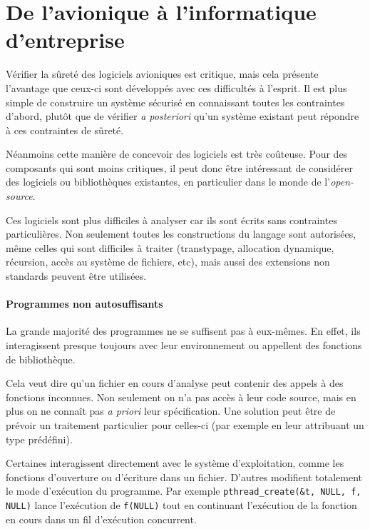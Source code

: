 \section{De l'avionique à l'informatique d'entreprise}

Vérifier la sûreté des logiciels avioniques est critique, mais cela présente
l'avantage que ceux-ci sont développés avec ces difficultés à l'esprit. Il est
plus simple de construire un système sécurisé en connaissant toutes les
contraintes d'abord, plutôt que de vérifier \emph{a posteriori} qu'un système
existant peut répondre à ces contraintes de sûreté.

Néanmoins cette manière de concevoir des logiciels est très coûteuse. Pour des
composants qui sont moins critiques, il peut donc être intéressant de considérer
des logiciels ou bibliothèques existantes, en particulier dans le monde de
l'\emph{open-source}.

Ces logiciels sont plus difficiles à analyser car ils sont écrits sans
contraintes particulières. Non seulement toutes les constructions du langage
sont autorisées, même celles qui sont difficiles à traiter (transtypage,
allocation dynamique, récursion, accès au système de fichiers, etc), mais aussi
des extensions non standards peuvent être utilisées.

\paragraph{Programmes non autosuffisants}

La grande majorité des programmes ne se suffisent pas à eux-mêmes. En effet, ils
interagissent presque toujours avec leur environnement ou appellent des
fonctions de bibliothèque.

Cela veut dire qu'un fichier en cours d'analyse peut contenir des appels à des
fonctions inconnues. Non seulement on n'a pas accès à leur code source, mais en
plus on ne connaît pas \emph{a priori} leur spécification. Une solution peut
être de prévoir un traitement particulier pour celles-ci (par exemple en leur
attribuant un type prédéfini).

Certaines interagissent directement avec le système d'exploitation, comme les
fonctions d'ouverture ou d'écriture dans un fichier. D'autres modifient
totalement le mode d'exécution du programme. Par exemple
\texttt{pthread\_create(\&t, NULL, f, NULL)} lance l'exécution de
\texttt{f(NULL)} tout en continuant l'exécution de la fonction en cours
dans un fil d'exécution concurrent.

